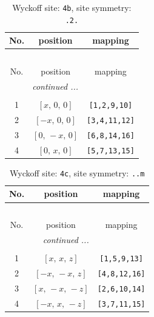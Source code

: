 \documentclass[fleqn,8pt]{jsarticle}
\begin{document}
\begin{longtable}{ccc}
\caption{Wyckoff site: {\tt 4b}, site symmetry: {\tt .2.}}
 \\
 \hline \hline
No. & position & mapping \\ \hline \endfirsthead

\multicolumn{2}{l}{\tablename\ \thetable{}} \\
 \hline \hline
No. & position & mapping \\ \hline \endhead

 \hline \hline
\multicolumn{2}{r}{\footnotesize\it continued ...} \\ \endfoot

 \hline \hline
\multicolumn{2}{r}{} \\ \endlastfoot

1 & $\left[ x,\, 0,\, 0 \right]$ & {\tt [1,2,9,10]} \\ \hline
2 & $\left[ - x,\, 0,\, 0 \right]$ & {\tt [3,4,11,12]} \\ \hline
3 & $\left[ 0,\, - x,\, 0 \right]$ & {\tt [6,8,14,16]} \\ \hline
4 & $\left[ 0,\, x,\, 0 \right]$ & {\tt [5,7,13,15]} \\
\end{longtable}
\renewcommand{\arraystretch}{1.2}
\begin{longtable}{ccc}
\caption{Wyckoff site: {\tt 4c}, site symmetry: {\tt ..m}}
 \\
 \hline \hline
No. & position & mapping \\ \hline \endfirsthead

\multicolumn{2}{l}{\tablename\ \thetable{}} \\
 \hline \hline
No. & position & mapping \\ \hline \endhead

 \hline \hline
\multicolumn{2}{r}{\footnotesize\it continued ...} \\ \endfoot

 \hline \hline
\multicolumn{2}{r}{} \\ \endlastfoot

1 & $\left[ x,\, x,\, z \right]$ & {\tt [1,5,9,13]} \\ \hline
2 & $\left[ - x,\, - x,\, z \right]$ & {\tt [4,8,12,16]} \\ \hline
3 & $\left[ x,\, - x,\, - z \right]$ & {\tt [2,6,10,14]} \\ \hline
4 & $\left[ - x,\, x,\, - z \right]$ & {\tt [3,7,11,15]} \\
\end{longtable}
\end{document}
